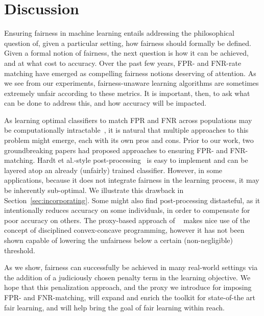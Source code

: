 \section{Discussion}
Ensuring fairness in machine learning entails addressing the philosophical question of, given a particular setting, how fairness should formally be defined. Given a formal notion of fairness, the next question is how it can be achieved, and at what cost to accuracy. Over the past few years, FPR- and FNR-rate matching have emerged as compelling fairness notions deserving of attention. As we see from our experiments, fairness-unaware learning algorithms are sometimes extremely unfair according to these metrics. It is important, then, to ask what can be done to address this, and how accuracy will be impacted.

As learning optimal classifiers to match FPR and FNR across populations may be computationally intractable~\cite{woodworth}, it is natural that multiple approaches to this problem might emerge, each with its own pros and cons. Prior to our work, two groundbreaking papers had proposed approaches to ensuring FPR- and FNR-matching. Hardt et al.-style post-processing~\cite{hardt} is easy to implement and can be layered atop an already (unfairly) trained classifier. However, in some applications, because it does not integrate fairness in the learning process, it may be inherently sub-optimal. We illustrate this drawback in Section~\ref{sec:incorporating}. Some might also find post-processing distasteful, as it intentionally reduces accuracy on some individuals, in order to compensate for poor accuracy on others. The proxy-based approach of ~\cite{disparatemistreatment} makes nice use of the concept of disciplined convex-concave programming, however it has not been shown capable of lowering the unfairness below a certain (non-negligible) threshold.

As we show, fairness can successfully be achieved in many real-world settings via the addition of a judiciously chosen penalty term in the learning objective. We hope that this penalization approach, and the proxy we introduce for imposing FPR- and FNR-matching, will expand and enrich the toolkit for state-of-the art fair learning, and will help bring the goal of fair learning within reach.



